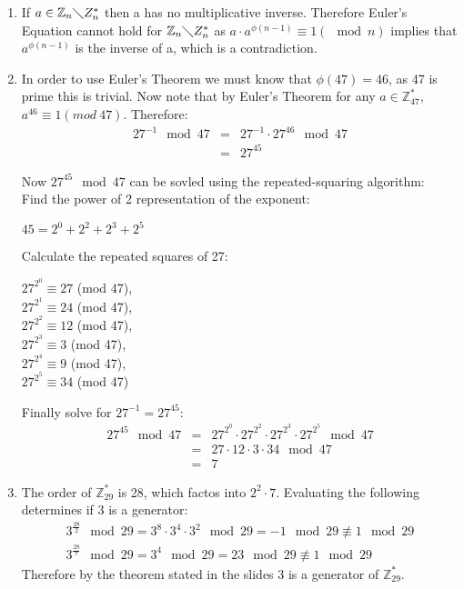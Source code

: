 \begin{enumerate}
    \item If $a \in \mathbb{Z}_{n}\mathbb\diagdown{Z}^{*}_{n}$ then a has no multiplicative inverse. Therefore Euler's Equation cannot hold for $\mathbb{Z}_{n}\mathbb\diagdown{Z}^{*}_{n}$ as $a \cdot a^{\phi(n-1)} \equiv 1 (\mod n)$ implies that $a^{\phi(n-1)}$ is the inverse of a, which is a contradiction.

    \item In order to use Euler's Theorem we must know that $\phi(47) = 46$, as 
    47 is prime this is trivial. Now note that by Euler's Theorem for any $a \in
     \mathbb{Z}^{*}_{47}$,\\ $a^{46} \equiv 1 (mod\ 47)$. Therefore:
    \begin{eqnarray*}
        27^{-1} \mod 47 &=& 27^{-1} \cdot 27^{46} \mod 47 \\
        &=& 27^{45}
    \end{eqnarray*}

    Now $27^{45} \mod 47$ can be sovled using the repeated-squaring algorithm: \\
    Find the power of 2 representation of the exponent:
    \begin{center}
        $45 = 2^{0} + 2^{2} + 2^{3} + 2^{5}$
    \end{center}

    Calculate the repeated squares of 27:
    \begin{center}
        $27^{2^{0}} \equiv 27$ (mod 47), \\
        $27^{2^{1}} \equiv 24$ (mod 47), \\
        $27^{2^{2}} \equiv 12$ (mod 47), \\
        $27^{2^{3}} \equiv 3$ (mod 47), \\
        $27^{2^{4}} \equiv 9$ (mod 47), \\
        $27^{2^{5}} \equiv 34$ (mod 47)
    \end{center}

    Finally solve for $27^{-1} = 27^{45}$:
    \begin{eqnarray*}
        27^{45} \mod 47 &=& 27^{2^{0}} \cdot 27^{2^{2}} \cdot 27^{2^{3}} \cdot 27^{2^{5}} \mod 47 \\
        &=& 27 \cdot 12 \cdot 3 \cdot 34 \mod 47 \\
        &=& 7
    \end{eqnarray*}

    \item The order of $\mathbb{Z}^{*}_{29}$ is 28, which factos into $2^{2} \cdot 7$. Evaluating the following determines if 3 is a generator:
    \begin{eqnarray*}
        3^{\frac{28}{2}} \mod 29 = 3^{8} \cdot 3^{4} \cdot 3^{2} \mod 29 = -1 \mod 29 \not\equiv 1 \mod 29 \\
        3^{\frac{28}{7}} \mod 29 = 3^{4} \mod 29 = 23 \mod 29 \not\equiv 1 \mod 29
    \end{eqnarray*}
    Therefore by the theorem stated in the slides\cite{Slides_70} 3 is a generator of $\mathbb{Z}^{*}_{29}$.

\end{enumerate}
